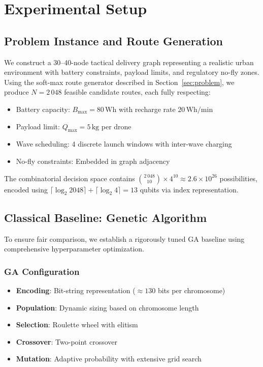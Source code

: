 \section{Experimental Setup}
\label{sec:experiments}

\subsection{Problem Instance and Route Generation}

We construct a 30--40-node tactical delivery graph representing a realistic urban environment with battery constraints, payload limits, and regulatory no-fly zones.
Using the soft-max route generator described in Section~\ref{sec:problem}, we produce $N = 2\,048$ feasible candidate routes, each fully respecting:
\begin{itemize}[nosep]
    \item Battery capacity: $B_{\max} = 80\,\text{Wh}$ with recharge rate $20\,\text{Wh/min}$
    \item Payload limit: $Q_{\max} = 5\,\text{kg}$ per drone
    \item Wave scheduling: 4 discrete launch windows with inter-wave charging
    \item No-fly constraints: Embedded in graph adjacency
\end{itemize}

The combinatorial decision space contains ${2\,048 \choose 10} \times 4^{10} \approx 2.6 \times 10^{26}$ possibilities, encoded using $\lceil\log_2 2048\rceil + \lceil\log_2 4\rceil = 13$ qubits via index representation.


\subsection{Classical Baseline: Genetic Algorithm}

To ensure fair comparison, we establish a rigorously tuned GA baseline using comprehensive hyperparameter optimization.

\subsubsection{GA Configuration}
\begin{itemize}[nosep]
    \item \textbf{Encoding}: Bit-string representation ($\approx 130$ bits per chromosome)
    \item \textbf{Population}: Dynamic sizing based on chromosome length 
    \item \textbf{Selection}: Roulette wheel with elitism
    \item \textbf{Crossover}: Two-point crossover
    \item \textbf{Mutation}: Adaptive probability with extensive grid search
\end{itemize}

